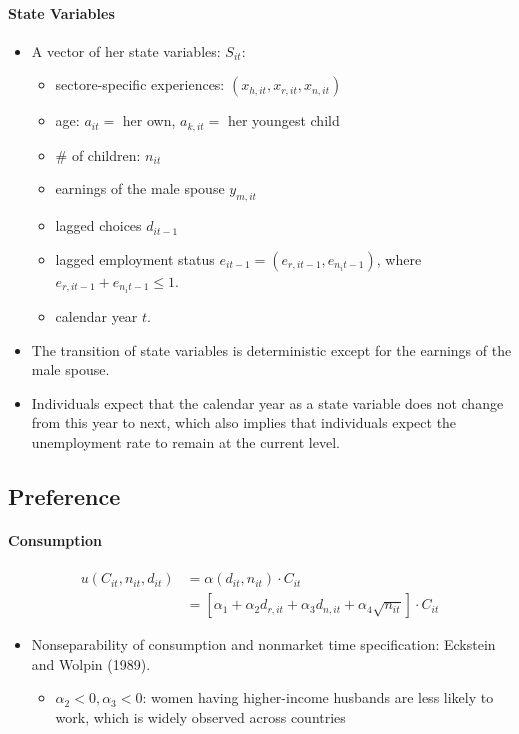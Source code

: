 \documentclass[../root]{subfiles}
\begin{document}
    \paragraph{State Variables}

    \begin{itemize}
      \item A vector of her state variables: $S_{it}$:
      \begin{itemize}
        \item sectore-specific experiences: $(x_{h, it}, x_{r, it}, x_{n, it})$
        \item age: $a_{it} = $ her own, $a_{k, it} = $ her youngest child
        \item \# of children: $n_{it}$
        \item earnings of the male spouse $y_{m, it}$
        \item lagged choices $d_{it-1}$
        \item lagged employment status $e_{it - 1} = (e_{r, it-1}, e_{n_it-1})$, where $e_{r, it-1} + e_{n_it-1} \leq 1$.
        \item calendar year $t$.
      \end{itemize}
      \item The transition of state variables is deterministic except for the earnings of the male spouse.
      \item Individuals expect that the calendar year as a state variable does not change from this year to next, which also implies that individuals expect the unemployment rate to remain at the current level.
    \end{itemize}

    \subsection{Preference}

    \paragraph{Consumption}

    \begin{align*}
      u(C_{it}, n_{it}, d_{it}) &= \alpha (d_{it}, n_{it}) \cdot C_{it} \\
      &= [\alpha_1 + \alpha_2 d_{r, it} + \alpha_3 d_{n, it} + \alpha_4 \sqrt{n_{it}}] \cdot C_{it}
    \end{align*}

    \begin{itemize}
      \item Nonseparability of consumption and nonmarket time specification: Eckstein and Wolpin (1989).
      \begin{itemize}
        \item $\alpha_2 < 0, \alpha_3 < 0$: women having higher-income husbands are less likely to work, which is widely observed across countries
      \end{itemize}
    \end{itemize}
\end{document}
